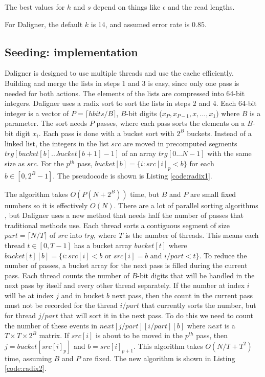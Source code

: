 \documentclass[../main/thesis.tex]{subfiles}
\begin{document}


The best values for $h$ and $s$ depend on things like $\epsilon$ and the read lengths.

For Daligner, the default $k$ is 14, and assumed error rate is $0.85$.


\subsection{Seeding: implementation}
Daligner is designed to use multiple threads and use the cache efficiently.
Building and merge the lists in steps 1 and 3 is easy, since only one pass is needed for both actions.
The elements of the lists are compressed into 64-bit integers.
Daligner uses a radix sort \cite{sorting}\cite{radix} to sort the lists in steps 2 and 4.
Each 64-bit integer is a vector of $P=\lceil hbits/B\rceil$, $B$-bit digits ($x_P,x_{P-1},x,...,x_1$) where $B$ is a parameter.
The sort needs $P$ passes, where each pass sorts the elements on a $B$-bit digit $x_i$.
Each pass is done with a bucket sort \cite{sorting} with $2^B$ buckets.
Instead of a linked list, the integers in the list $src$ are moved in precomputed segments $trg[bucket[b]...bucket[b+1]-1]$ of an array $trg[0...N-1]$ with the same size as $src$.
For the $p^{th}$ pass, $bucket[b] = \{i: src[i]_p < b\}$ for each $b \in [0,2^B-1]$.
The pseudocode is shown is Listing \ref{code:radix1}.



The algorithm takes $O(P(N+2^B))$ time, but $B$ and $P$ are small fixed numbers so it is effectively $O(N)$.
There are a lot of parallel sorting algorithms \cite{parRadix1}\cite{parRadix2}, but Daligner uses a new method that needs half the number of passes that traditional methods use.
Each thread sorts a contiguous segment of size $part = \lceil N/T\rceil$ of $src$ into $trg$, where $T$ is the number of threads.
This means each thread $t \in [0,T-1]$ has a bucket array $bucket[t]$ where $bucket[t][b] = \{i: src[i] < b$ or $src[i] = b$ and $i/part < t\}$.
To reduce the number of passes, a bucket array for the next pass is filled during the current pass.
Each thread counts the number of $B$-bit digits that will be handled in the next pass by itself and every other thread separately.
If the number at index $i$ will be at index $j$ and in bucket $b$ next pass, then the count in the current pass must not be recorded for the thread $i/part$ that currently sorts the number, but for thread $j/part$ that will sort it in the next pass.
To do this we need to count the number of these events in $next[j/part][i/part][b]$ where $next$ is a $T\times T\times 2^B$ matrix.
If $src[i]$ is about to be moved in the $p^{th}$ pass, then $j = bucket[src[i]_p]$ and $b = src[i]_{p+1}$.
This algorithm takes $O(N/T+T^2)$ time, assuming $B$ and $P$ are fixed.
The new algorithm is shown in Listing \ref{code:radix2}.
\end{document}
